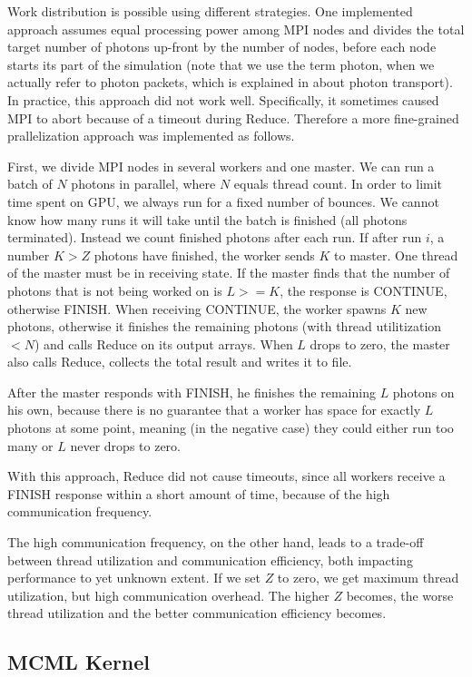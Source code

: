 \documentclass[]{article}
\begin{document}
Work distribution is possible using different strategies. One implemented approach assumes equal processing power among MPI nodes and divides the total target number of photons up-front by the number of nodes, before each node starts its part of the simulation (note that we use the term photon, when we actually refer to photon packets, which is explained in  about photon transport). In practice, this approach did not work well. Specifically, it sometimes caused MPI to abort because of a timeout during Reduce. Therefore a more fine-grained prallelization approach was implemented as follows.

First, we divide MPI nodes in several workers and one master. We can run a batch of $N$ photons in parallel, where $N$ equals thread count. In order to limit time spent on GPU, we always run for a fixed number of bounces. We cannot know how many runs it will take until the batch is finished (all photons terminated). Instead we count finished photons after each run. If after run $i$, a number $K > Z$ photons have finished, the worker sends $K$ to master. One thread of the master must be in receiving state. If the master finds that the number of photons that is not being worked on is $L >= K$, the response is CONTINUE, otherwise FINISH. When receiving CONTINUE, the worker spawns $K$ new photons, otherwise it finishes the remaining photons (with thread utilitization $< N$) and calls Reduce on its output arrays. When $L$ drops to zero, the master also calls Reduce, collects the total result and writes it to file.

After the master responds with FINISH, he finishes the remaining $L$ photons on his own, because there is no guarantee that a worker has space for exactly $L$ photons at some point, meaning (in the negative case) they could either run too many or $L$ never drops to zero.

With this approach, Reduce did not cause timeouts, since all workers receive a FINISH response within a short amount of time, because of the high communication frequency.

The high communication frequency, on the other hand, leads to a trade-off between thread utilization and communication efficiency, both impacting performance to yet unknown extent. If we set $Z$ to zero, we get maximum thread utilization, but high communication overhead. The higher $Z$ becomes, the worse thread utilization and the better communication efficiency becomes.

\subsection{MCML Kernel}
\label{impl:photon-transport}
\end{document}
